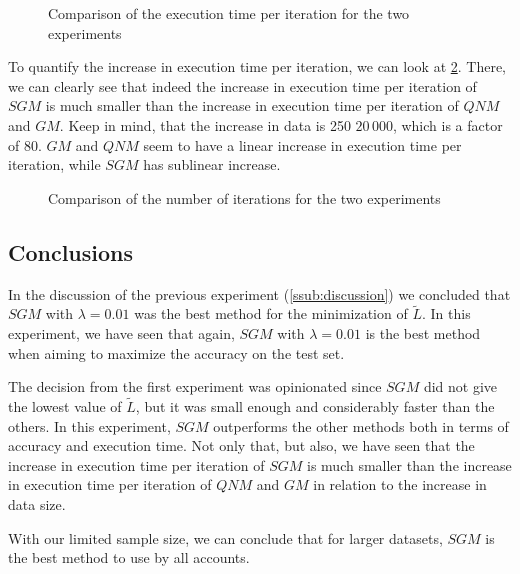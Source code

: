 \begin{figure}[H]
    
    \caption{Comparison of the execution time per iteration for the two experiments}
    \label{fig:comp_tex}
\end{figure}

To quantify the increase in execution time per iteration, we can look at
\cref{fig:comp_ratio}. There, we can clearly see that indeed the increase
in execution time per iteration of $SGM$ is much smaller than the increase
in execution time per iteration of $QNM$ and $GM$. Keep in mind, that
the increase in data is 250 \textrightarrow{} $20\,000$, which is a factor of 80.
$GM$ and $QNM$ seem to have a linear increase in execution time per iteration,
while $SGM$ has sublinear increase.

\begin{figure}[H]
    
    \caption{Comparison of the number of iterations for the two experiments}
    \label{fig:comp_ratio}
\end{figure}

%     

\subsection{Conclusions}

In the discussion of the previous experiment (\cref{ssub:discussion}) we concluded that
$SGM$ with $\lambda = 0.01$ was the best method for the minimization of
$\tilde L$. In this experiment, we have seen that again, $SGM$ with $\lambda = 0.01$
is the best method when aiming to maximize the accuracy on the test set.

The decision from the first experiment was opinionated since
$SGM$ did not give the lowest value of $\tilde L$, but it was small enough and
considerably faster than the others. In this experiment, $SGM$ outperforms the other
methods both in terms of accuracy and execution time. Not only that, but also, we have
seen that the increase in execution time per iteration of $SGM$ is much smaller than
the increase in execution time per iteration of $QNM$ and $GM$ in relation to the
increase in data size.

With our limited sample size,
we can conclude that for larger datasets,
$SGM$ is the best method to use by all accounts.

